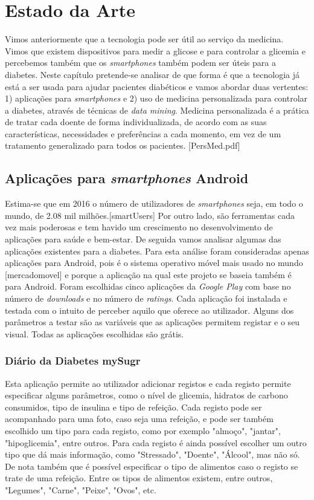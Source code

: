 \chapter{Estado da Arte}\label{chap:stat}

Vimos anteriormente que a tecnologia pode ser útil ao serviço da medicina. Vimos que existem dispositivos para medir a glicose e para controlar a glicemia e percebemos também que os \textit{smartphones} também podem ser úteis para a diabetes. Neste capítulo pretende-se analisar de que forma é que a tecnologia já está a ser usada para ajudar pacientes diabéticos e vamos abordar duas vertentes: 1) aplicações para \textit{smartphones} e 2) uso de medicina personalizada para controlar a diabetes, através de técnicas de \textit{data mining}. 
Medicina personalizada é a prática de tratar cada doente de forma individualizada, de acordo com as suas características, necessidades e preferências a cada momento, em vez de um tratamento generalizado para todos os pacientes. [PersMed.pdf]


\section{Aplicações para \textit{smartphones} Android}

Estima-se que em 2016 o número de utilizadores de \textit{smartphones} seja, em todo o mundo, de 2.08 mil milhões.[smartUsers] 
Por outro lado, são ferramentas cada vez mais poderosas e tem havido um crescimento no desenvolvimento de aplicações para saúde e bem-estar. De seguida vamos analisar algumas das aplicações existentes para a diabetes. Para esta análise foram consideradas apenas aplicações para Android, pois é o sistema operativo móvel mais usado no mundo [mercadomovel] e porque a aplicação na qual este projeto se baseia também é para Android. Foram escolhidas cinco aplicações da \textit{Google Play} com base no número de \textit{downloads} e no número de \textit{ratings}. Cada aplicação foi instalada e testada com o intuito de perceber aquilo que oferece ao utilizador. Alguns dos parâmetros a testar são as variáveis que as aplicações permitem registar e o seu visual. Todas as aplicações escolhidas são grátis.

\subsection{Diário da Diabetes mySugr}

Esta aplicação permite ao utilizador adicionar registos e cada registo permite especificar alguns parâmetros, como o nível de glicemia, hidratos de carbono consumidos, tipo de insulina e tipo de refeição. Cada registo pode ser acompanhado para uma foto, caso seja uma refeição, e pode ser também escolhido um tipo para cada registo, como por exemplo "almoço", "jantar", "hipoglicemia", entre outros. Para cada registo é ainda possível escolher um outro tipo que dá mais informação, como "Stressado", "Doente", "Álcool", mas não só. De nota também que é possível especificar o tipo de alimentos caso o registo se trate de uma refeição. Entre os tipos de alimentos existem, entre outros, "Legumes", "Carne", "Peixe", "Ovos", etc.

